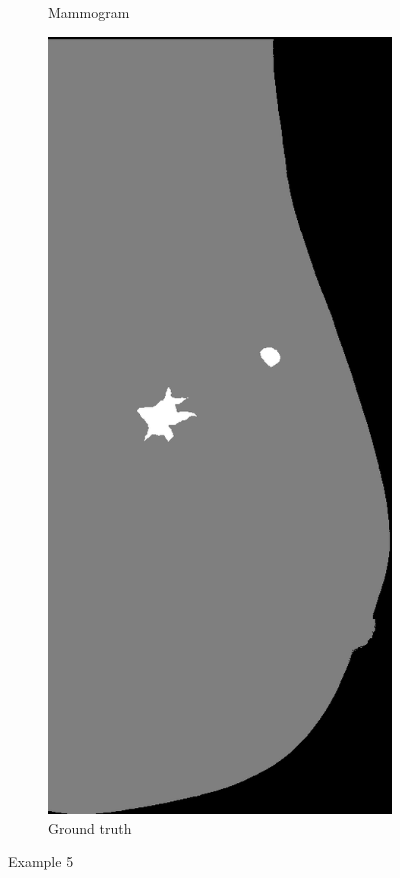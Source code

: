\begin{figure}[h]
\begin{subfigure}{0.2\textwidth}
         \caption{Mammogram}
	\end{subfigure}
	\quad
	\begin{subfigure}{0.2\textwidth}
		\centering
			\includegraphics[width=\textwidth]{plots/examples/label_5.png}
         \caption{Ground truth}
	\end{subfigure}
	\caption[Example 5]{Example 5}
\end{figure}

